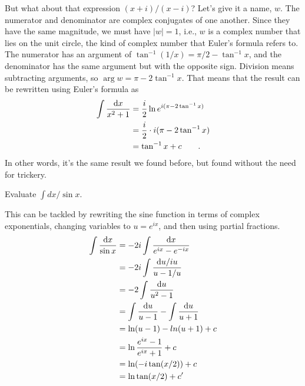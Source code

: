 But what about that expression $(x+i)/(x-i)$? Let's give it a name,
$w$. The numerator and denominator are complex conjugates of one
another. Since they have the same magnitude, we must have $|w|=1$,
i.e., $w$ is a complex number that lies on the unit circle, the
kind of complex number that Euler's formula refers to. The numerator
has an argument of $\tan^{-1}(1/x)=\pi/2-\tan^{-1}x$, and the denominator
has the same argument but with the opposite sign. Division means subtracting
arguments, so $\arg w=\pi-2\tan^{-1}x$. That means that the result can
be rewritten using Euler's formula as
\begin{align*}
  \int \frac{\textup{d} x}{x^2+1} &= \frac{i}{2}\ln e^{i(\pi-2\tan^{-1}x)} \\
      &=  \frac{i}{2}\cdot i(\pi-2\tan^{-1}x) \\
      &=  \tan^{-1}x + c \qquad .
\end{align*}
In other words, it's the same result we found before, but found 
without the need for trickery.

\begin{eg}
\egquestion Evaluate $\int dx/\sin x$.

\eganswer
This can be tackled by rewriting the sine function in terms of complex exponentials, changing variables
to $u=e^{ix}$, and then using partial fractions.
\begin{align*}
  \int \frac{\textup{d} x}{\sin x} &= -2i \int \frac{\textup{d} x}{e^{ix}-e^{-ix}} \\
                             &= -2i \int \frac{\textup{d} u/iu}{u-1/u} \\
                             &= -2\int \frac{\textup{d} u}{u^2-1} \\
                             &= \int \frac{\textup{d} u}{u-1} - \int \frac{\textup{d} u}{u+1} \\
                             &= \ln(u-1)-ln(u+1) +c \\
                             &= \ln \frac{e^{ix}-1}{e^{ix}+1} +c \\
                             &= \ln(-i\tan(x/2)) +c \\
                             &= \ln\tan(x/2)+ c'
\end{align*}
\end{eg}

